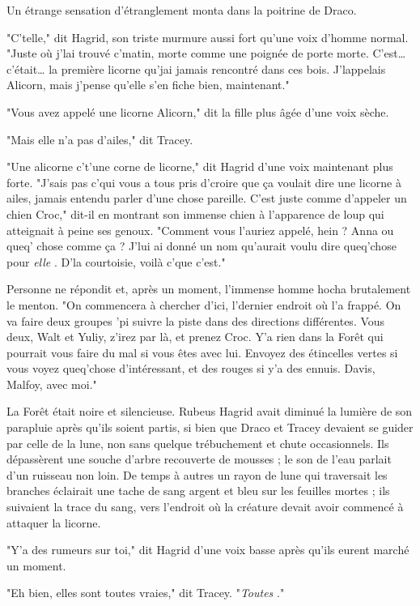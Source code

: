 Un étrange sensation d'étranglement monta dans la poitrine de Draco.

"C'telle," dit Hagrid, son triste murmure aussi fort qu'une voix d'homme normal. "Juste où j'lai trouvé c'matin, morte comme une poignée de porte morte. C'est… c'était… la première licorne qu'jai jamais rencontré dans ces bois. J'lappelais Alicorn, mais j'pense qu'elle s'en fiche bien, maintenant."

"Vous avez appelé une licorne Alicorn," dit la fille plus âgée d'une voix sèche.

"Mais elle n'a pas d'ailes," dit Tracey.

"Une alicorne c't'une corne de licorne," dit Hagrid d'une voix maintenant plus forte. "J'sais pas c'qui vous a tous pris d'croire que ça voulait dire une licorne à ailes, jamais entendu parler d'une chose pareille. C'est juste comme d'appeler un chien Croc," dit-il en montrant son immense chien à l'apparence de loup qui atteignait à peine ses genoux. "Comment vous l'auriez appelé, hein ? Anna ou queq' chose comme ça ? J'lui ai donné un nom qu'aurait voulu dire queq'chose pour \emph{elle} . D'la courtoisie, voilà c'que c'est."

Personne ne répondit et, après un moment, l'immense homme hocha brutalement le menton. "On commencera à chercher d'ici, l'dernier endroit où l'a frappé. On va faire deux groupes 'pi suivre la piste dans des directions différentes. Vous deux, Walt et Yuliy, z'irez par là, et prenez Croc. Y'a rien dans la Forêt qui pourrait vous faire du mal si vous êtes avec lui. Envoyez des étincelles vertes si vous voyez queq'chose d'intéressant, et des rouges si y'a des ennuis. Davis, Malfoy, avec moi."

La Forêt était noire et silencieuse. Rubeus Hagrid avait diminué la lumière de son parapluie après qu'ils soient partis, si bien que Draco et Tracey devaient se guider par celle de la lune, non sans quelque trébuchement et chute occasionnels. Ils dépassèrent une souche d'arbre recouverte de mousses ; le son de l'eau parlait d'un ruisseau non loin. De temps à autres un rayon de lune qui traversait les branches éclairait une tache de sang argent et bleu sur les feuilles mortes ; ils suivaient la trace du sang, vers l'endroit où la créature devait avoir commencé à attaquer la licorne.

"Y'a des rumeurs sur toi," dit Hagrid d'une voix basse après qu'ils eurent marché un moment.

"Eh bien, elles sont toutes vraies," dit Tracey. "\emph{Toutes} ."

